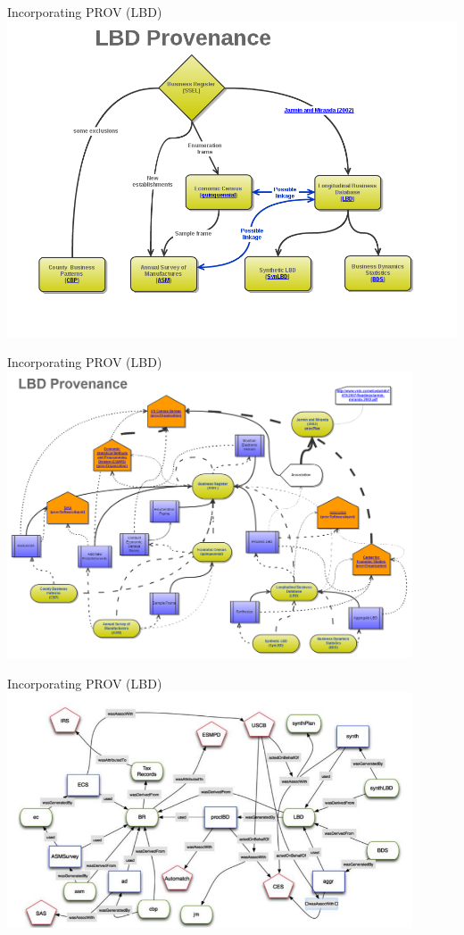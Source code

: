 \begin{frame}{Incorporating PROV (LBD)}
\includegraphics[width=\textwidth]{LBD_Provenance.png}
\end{frame}

\begin{frame}{Incorporating PROV (LBD)}
\includegraphics[width=0.9\textwidth]{LBD_PROV_-_WIP.png}
\end{frame}

\begin{frame}{Incorporating PROV (LBD)}
\includegraphics[width=0.9\textwidth]{LBD_Prov_simplified.png}
\end{frame}

